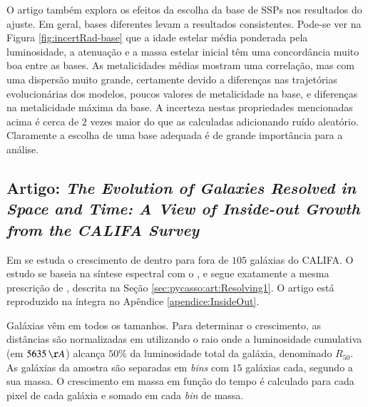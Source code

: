 O artigo também explora os efeitos da escolha da base de SSPs nos resultados do
ajuste. Em geral, bases diferentes levam a resultados consistentes.
Pode-se ver na Figura \ref{fig:incertRad-base} que a idade estelar
média ponderada pela luminosidade, a atenuação e a massa estelar inicial
têm uma concordância muito boa entre as bases. As metalicidades médias mostram
uma correlação, mas com uma dispersão muito grande, certamente devido a
diferenças nas trajetórias evolucionárias dos modelos, poucos valores
de metalicidade na base, e diferenças na metalicidade máxima da base. A
incerteza nestas propriedades mencionadas acima é cerca de $2$ vezes maior do
que as calculadas adicionando ruído aleatório. Claramente a escolha de uma base
adequada é de grande importância para a análise.



\subsection{Artigo: {\em The Evolution of Galaxies Resolved in Space and Time: A
View of Inside-out Growth from the CALIFA Survey}}
\label{sec:pycasso:art:InsideOut}

Em \citet{Perez2013} se estuda o crescimento de dentro para fora de $105$
galáxias do CALIFA. O estudo se baseia na síntese espectral com o \starlight, e
segue exatamente a mesma prescrição de \citet{CidFernandes2013a}, descrita na
Seção \ref{sec:pycasso:art:Resolving1}. O artigo está reproduzido na íntegra no
Apêndice \ref{apendice:InsideOut}.

Galáxias vêm em todos os tamanhos. Para determinar o crescimento, as distâncias
são normalizadas em utilizando o raio onde a luminosidade cumulativa (em
$5635\,\AA$) alcança $50\%$ da luminosidade total da galáxia, denominado
$R_{50}$. As galáxias da amostra são separadas em {\em bins} com $15$ galáxias
cada, segundo a sua massa. O crescimento em massa em função do tempo é calculado
para cada pixel de cada galáxia e somado em cada {\em bin} de massa.


